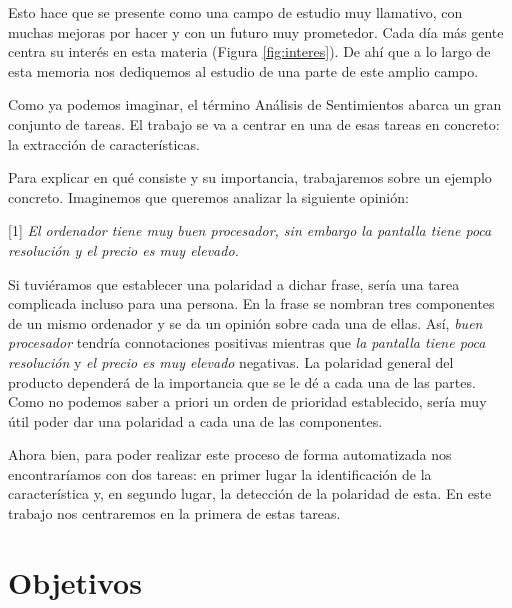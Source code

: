 	 Esto hace que se presente como una campo de estudio muy llamativo, con muchas mejoras por hacer y con un futuro muy prometedor. Cada día más gente centra su interés en esta materia (Figura \ref{fig:interes}). De ahí que a lo largo de esta memoria nos dediquemos al estudio de una parte de este amplio campo.
	 

	Como ya podemos imaginar, el término Análisis de Sentimientos abarca un gran conjunto de tareas. El trabajo se va a centrar en una de esas tareas en concreto: la extracción de características. 

	Para explicar en qué consiste y su importancia, trabajaremos sobre un ejemplo concreto. Imaginemos que queremos analizar la siguiente opinión:
	
	\begin{center}
		\begin{minipage}{0.9\linewidth}
			\vspace{5pt}%
			{\small
				[1] \textit{El ordenador tiene muy buen procesador, sin embargo la pantalla tiene poca resolución y el precio es muy elevado.}
			}
			\vspace{5pt}%
		\end{minipage}
	\end{center}

	Si tuviéramos que establecer una polaridad a dichar frase, sería una tarea complicada incluso para una persona. En la frase se nombran tres componentes de un mismo ordenador y se da un opinión sobre cada una de ellas. Así, \textit{buen procesador} tendría connotaciones positivas mientras que \textit{la pantalla tiene poca resolución} y \textit{el precio es muy elevado} negativas. La polaridad general del producto dependerá de la importancia que se le dé a cada una de las partes. Como no podemos saber a priori un orden de prioridad establecido, sería muy útil poder dar una polaridad a cada una de las componentes.
	
	Ahora bien, para poder realizar este proceso de forma automatizada nos encontraríamos con dos tareas: en primer lugar la identificación de la característica y, en segundo lugar, la detección de la polaridad de esta. En este trabajo nos centraremos en la primera de estas tareas. 

	\section{Objetivos} \label{objetivos}
	
	
	
		

	
